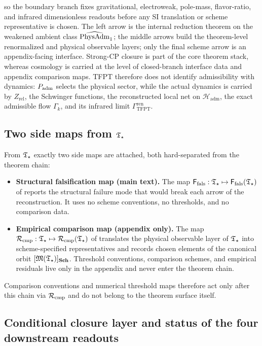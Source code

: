 so the boundary branch fixes gravitational, electroweak, pole-mass, flavor-ratio, and infrared
dimensionless readouts before any SI translation or scheme representative is chosen.
The left arrow is the internal reduction theorem on the weakened ambient class $\widehat{\mathrm{PhysAdm}}_1$; the
middle arrows build the theorem-level renormalized and physical observable layers; only the final
scheme arrow is an appendix-facing interface. Strong-CP closure is part of the core theorem stack,
whereas cosmology is carried at the level of closed-branch interface data and appendix comparison
maps. TFPT therefore does not identify
admissibility with dynamics: $P_{\mathrm{adm}}$ selects the physical sector, while the actual dynamics is
carried by $Z_{\mathrm{rel}}$, the Schwinger functions, the reconstructed local net on
$\mathcal H_{\mathrm{adm}}$, the exact admissible flow $\Gamma_k$, and its infrared limit
$\Gamma_{\mathrm{TFPT}}^{\mathrm{ren}}$.

\subsection{Two side maps from \texorpdfstring{$\mathfrak T_{\star}$}{T-star}}

From $\mathfrak T_{\star}$ exactly two side maps are attached, both hard-separated from the theorem chain:
\begin{itemize}[leftmargin=1.5em, topsep=3pt, itemsep=2pt]
    \item \textbf{Structural falsification map (main text).} The map
    $\mathsf F_{\mathrm{fals}}:\mathfrak T_{\star}\mapsto\mathsf F_{\mathrm{fals}}(\mathfrak T_{\star})$ of  reports the
    structural failure mode that would break each arrow of the reconstruction. It uses no
    scheme conventions, no thresholds, and no comparison data.
    \item \textbf{Empirical comparison map (appendix only).} The map
    $\mathcal R_{\mathrm{cmp}}:\mathfrak T_{\star}\mapsto\mathcal R_{\mathrm{cmp}}(\mathfrak T_{\star})$ of  translates the
    physical observable layer of $\mathfrak T_{\star}$ into scheme-specified representatives and records chosen
    elements of the canonical orbit $[\mathfrak M(\mathfrak T_{\star})]_{\mathbf{Sch}}$. Threshold conventions, comparison
    schemes, and empirical residuals live only in the appendix and never enter the theorem chain.
\end{itemize}
Comparison conventions and numerical threshold maps therefore act only after this chain via
$\mathcal R_{\mathrm{cmp}}$ and do not belong to the theorem surface itself.

\subsection{Conditional closure layer and status of the four downstream readouts}
\label{subsec:conditional-closure-status}

